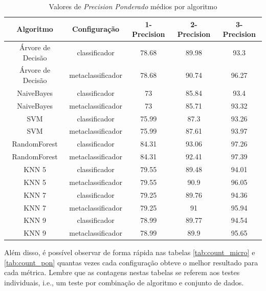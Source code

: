 \begin{table}[h!]
  \begin{center}
    \resizebox{\textwidth}{!} {
    \begin{tabular}{ccccc}
      \hline
      \textbf{Algoritmo} & \textbf{Configuração} & \textbf{1-Precision} & \textbf{2-Precision} & \textbf{3-Precision}\\
      \hline

Árvore de Decisão	&	classificador	&	78.68	&	89.98	&	93.3	\\
Árvore de Decisão	&	metaclassificador	&	78.68	&	90.74	&	96.27	\\
NaiveBayes	&	classificador	&	73	&	85.84	&	93.4	\\
NaiveBayes	&	metaclassificador	&	73	&	85.71	&	93.32	\\
SVM	&	classificador	&	75.99	&	87.3	&	93.26	\\
SVM	&	metaclassificador	&	75.99	&	87.61	&	93.97	\\
RandomForest	&	classificador	&	84.31	&	93.06	&	97.26	\\
RandomForest	&	metaclassificador	&	84.31	&	92.41	&	97.39	\\
KNN 5	&	classificador	&	79.55	&	89.48	&	94.01	\\
KNN 5	&	metaclassificador	&	79.55	&	90.9	&	96.05	\\
KNN 7	&	classificador	&	79.25	&	89.76	&	94.36	\\
KNN 7	&	metaclassificador	&	79.25	&	91	&	95.94	\\
KNN 9	&	classificador	&	78.99	&	89.77	&	94.54	\\
KNN 9	&	metaclassificador	&	78.99	&	89.9	&	95.65	\\

      \hline
    \end{tabular}
    }
    \caption{Valores de \textit{Precision Ponderado} médios por algoritmo}
    \label{tab:prec_pon}
  \end{center}
\end{table}

Além disso, é possível observar de forma rápida nas tabelas \ref{tab:count_micro} e \ref{tab:count_pon} quantas vezes cada configuração obteve o melhor resultado para cada métrica.
Lembre que as contagens nestas tabelas se referem aos testes individuais, i.e., um teste por combinação de algoritmo e conjunto de dados.

